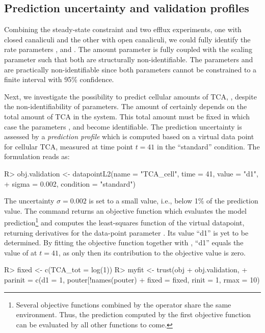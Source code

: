 \documentclass[article]{jss}
\begin{document}
\subsection{Prediction uncertainty and validation profiles}

Combining the steady-state constraint and two efflux experiments, one with
closed canaliculi and the other with open canaliculi, we could fully identify
the rate parameters ,  and . The
amount parameter  is fully coupled with the scaling parameter
 such that both are structurally non-identifiable. The parameters
 and  are practically non-identifiable
since both parameters cannot be constrained to a finite interval with 95\%
confidence.

Next, we investigate the possibility to predict cellular amounts of TCA,
, despite the non-identifiability of parameters. 
The amount of  certainly depends on the total
amount of TCA in the system. This total amount must be fixed in which case the
parameters ,  and  become identifiable.
The prediction uncertainty is assessed by a \textit{prediction profile}
which is computed based on a virtual data point for cellular TCA, measured at
time point $t = 41$ in the ``standard'' condition. The  formulation reads as:
%
\begin{CodeChunk}
\begin{CodeInput}
R> obj.validation <- datapointL2(name = "TCA_cell", time = 41, value = "d1",
+    sigma = 0.002, condition = "standard")
\end{CodeInput}
\end{CodeChunk}
%
The uncertainty $\sigma = 0.002$ is set to a small
value, i.e., below 1\% of the prediction value. The 
command returns an objective function which evaluates the model prediction\footnote{Several objective functions combined by the  operator
share the same environment. Thus, the prediction computed by the first
objective function can be evaluated by all other functions to come.} and
computes the least-squares function of the virtual datapoint, returning
derivatives for the data-point parameter . Its value ``d1'' is yet to be
determined. By fitting the objective function  together with
, ``d1'' equals the value of  at
$t=41$, as only then its contribution to the objective value is zero.
\begin{CodeChunk}
\begin{CodeInput}
R> fixed <- c(TCA_tot = log(1))
R> myfit <- trust(obj + obj.validation,
+    parinit = c(d1 = 1, pouter[!names(pouter) %
+    fixed = fixed, rinit = 1, rmax = 10)
\end{CodeInput}
\end{CodeChunk}
\end{document}
